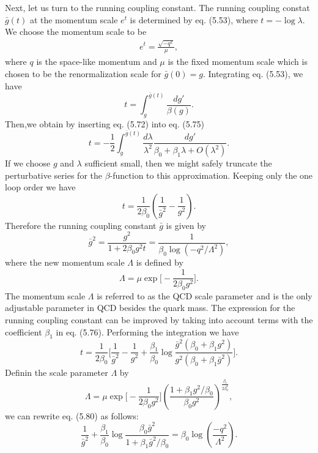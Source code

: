 Next, let us turn to the running coupling constant. The running coupling constat $\bar{g}(t)$ at the momentum scale $e^t$ is determined by eq. (5.53), where $t=-\log\lambda$. We choose the momentum scale to be 
\begin{eqnarray}
e^t=\frac{\sqrt{-q^2}}{\mu},
\end{eqnarray}
where $q$ is the space-like momentum and $\mu$ is the fixed momentum scale which is chosen to be the renormalization scale for $\bar{g}(0)=g$. Integrating eq. (5.53), we have
\begin{equation}
t=\int_{g}^{\bar{g}(t)}\frac{dg'}{\beta(g)}.
\end{equation}
Then,we obtain by inserting eq. (5.72) into eq. (5.75)
\begin{equation}
t=-\frac{1}{2}\int_{g}^{\bar{g}(t)}\frac{d\lambda}{\lambda^2}\frac{dg'}{\beta_0+\beta_1\lambda+O(\lambda^2)}.
\end{equation}
If we choose $g$ and $\lambda$ sufficient small, then we might safely truncate the perturbative series for the $\beta$-function 
to this approximation. Keeping only the one loop order we have 
\begin{equation}
t=\frac{1}{2\beta_0}\left( \frac{1}{\bar{g}^2}-\frac{1}{g^2} \right).
\end{equation}
Therefore the running coupling constant $\bar{g}$ is given by
\begin{equation}
\bar{g}^2=\frac{g^2}{1+2\beta_0g^2t}=\frac{1}{\beta_0\log(-q^2/\Lambda^2)},
\end{equation}
where the new momentum scale $\Lambda$ is defined by
\begin{equation}
\Lambda=\mu\exp\biggl[-\frac{1}{2\beta_0g^2} \biggr].
\end{equation}
The momentum scale $\Lambda$ is referred to as the QCD scale parameter and is the only adjustable parameter in QCD besides the quark mass. The expression for the running coupling constant can be improved by taking into account terms with the coefficient $\beta_1$ in eq. (5.76). Performing the integration we have
\begin{equation}
t=\frac{1}{2\beta_0}\biggl[ \frac{1}{\bar{g}^2}-\frac{1}{g^2}+\frac{\beta_1}{\beta_0}\log\frac{\bar{g}^2(\beta_0+\beta_1g^2)}{g^2(\beta_0+\beta_1\bar{g}^2)} \biggr].
\end{equation} 
Definin the scale parameter $\Lambda$ by
\begin{equation}
\Lambda=\mu\exp\biggl[-\frac{1}{2\beta_0g^2} \biggr]\left( \frac{1+\beta_1g^2/\beta_0}{\beta_0g^2} \right)^\frac{\beta_1}{2\beta_0^2}, 
\end{equation}
we can rewrite eq. (5.80) as follows:
\begin{equation}
\frac{1}{\bar{g}^2}+\frac{\beta_1}{\beta_0}\log\frac{\beta_0\bar{g}^2}{1+\beta_1\bar{g}^2/\beta_0}=\beta_0\log\left( \frac{-q^2}{\Lambda^2}\right).
\end{equation}

